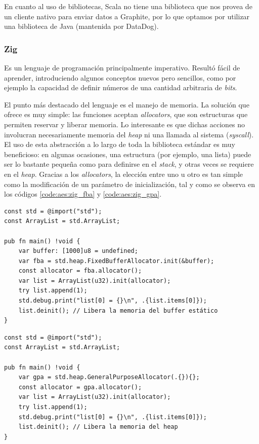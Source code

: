 \documentclass[11pt]{article}
\let\Oldsubsubsection\subsubsection
\renewcommand{\subsubsection}{\FloatBarrier\Oldsubsubsection}
\newcommand{\english}[1]{\textit{#1}}
\begin{document}
En cuanto al uso de bibliotecas, Scala no tiene una biblioteca que nos provea de un cliente nativo para enviar datos a Graphite, por lo que optamos por utilizar una biblioteca de Java (mantenida por DataDog).

\subsubsection{Zig}

Es un lenguaje de programación principalmente imperativo. Resultó fácil de aprender, introduciendo algunos conceptos nuevos pero sencillos, como por ejemplo la capacidad de definir números de una cantidad arbitraria de \english{bits}.

El punto más destacado del lenguaje es el manejo de memoria. La solución que ofrece es muy simple: las funciones aceptan \english{allocators}, que son estructuras que permiten reservar y liberar memoria. Lo interesante es que dichas acciones no involucran necesariamente memoria del \english{heap} ni una llamada al sistema (\english{syscall}). El uso de esta abstracción a lo largo de toda la biblioteca estándar es muy beneficioso: en algunas ocasiones, una estructura (por ejemplo, una lista) puede ser lo bastante pequeña como para definirse en el \english{stack}, y otras veces se requiere en el \english{heap}. Gracias a los \english{allocators}, la elección entre uno u otro es tan simple como la modificación de un parámetro de inicialización, tal y como se observa en los códigos \ref{code:aes:zig_fba} y \ref{code:aes:zig_gpa}.

\begin{listing}[h]
\begin{verbatim}
const std = @import("std");
const ArrayList = std.ArrayList;

pub fn main() !void {
    var buffer: [1000]u8 = undefined;
    var fba = std.heap.FixedBufferAllocator.init(&buffer);
    const allocator = fba.allocator();
    var list = ArrayList(u32).init(allocator);
    try list.append(1);
    std.debug.print("list[0] = {}\n", .{list.items[0]});
    list.deinit(); // Libera la memoria del buffer estático
}
\end{verbatim}
\caption{Inicialización de una lista en el \english{stack} por medio de un \lstinline{FixedBufferAllocator}, en Zig}
\label{code:aes:zig_fba}
\end{listing}

\begin{listing}[h]
\begin{verbatim}
const std = @import("std");
const ArrayList = std.ArrayList;

pub fn main() !void {
    var gpa = std.heap.GeneralPurposeAllocator(.{}){};
    const allocator = gpa.allocator();
    var list = ArrayList(u32).init(allocator);
    try list.append(1);
    std.debug.print("list[0] = {}\n", .{list.items[0]});
    list.deinit(); // Libera la memoria del heap
}
\end{verbatim}
\caption{Inicialización de una lista en el \english{heap} por medio de un \lstinline{GeneralPurposeAllocator}, en Zig}
\label{code:aes:zig_gpa}
\end{listing}
\end{document}
